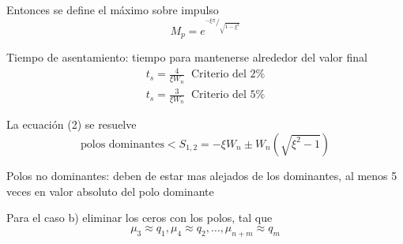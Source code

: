 Entonces se define el máximo sobre impulso
\[
    M_{p} = e^{^{- \xi \pi}/_{\sqrt{1 - \xi^{2}}}}
\]

Tiempo de asentamiento: tiempo para mantenerse alrededor del valor final
\[
    \begin{split}
        t_{s} = \frac{4}{\xi W_{n}} \;\; \text{Criterio del 2\%} \\
        t_{s} = \frac{3}{\xi W_{n}} \;\; \text{Criterio del 5\%}
    \end{split}
\]

La ecuación (2) se resuelve 
\[
    \text{polos dominantes} < S_{1,2} = -\xi W_{n} \pm W_{n}(\sqrt{\xi^{2} - 1})
\]

Polos no dominantes: deben de estar mas alejados de los dominantes, al menos 5 veces en valor absoluto del polo dominante

Para el caso b) eliminar los ceros con los polos, tal que
\[
    \mu_{3} \approx q_{1}, \mu_{4} \approx q_{2}, \ldots,
     \mu_{n+m} \approx q_{m} 
\]